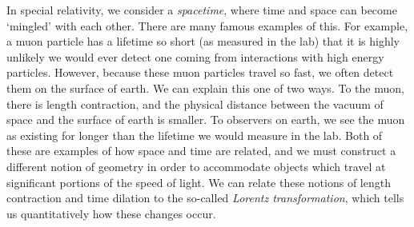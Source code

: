 In special relativity, we consider a \textit{spacetime}, where time and space can become `mingled' with each other. There are many famous examples of this. For example, a muon particle has a lifetime so short (as measured in the lab) that it is highly unlikely we would ever detect one coming from interactions with high energy particles. However, because these muon particles travel so fast, we often detect them on the surface of earth. We can explain this one of two ways. To the muon, there is length contraction, and the physical distance between the vacuum of space and the surface of earth is smaller.  To observers on earth, we see the muon as existing for longer than the lifetime we would measure in the lab. Both of these are examples of how space and time are related, and we must construct a different notion of geometry in order to accommodate objects which travel at significant portions of the speed of light. We can relate these notions of length contraction and time dilation to the so-called \textit{Lorentz transformation}, which tells us quantitatively how these changes occur. 


